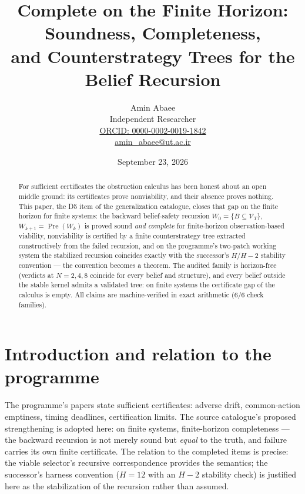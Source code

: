 \documentclass[10pt,twocolumn]{article}
\theoremstyle{definition}
\begin{document}
\title{Complete on the Finite Horizon: Soundness, Completeness,\\ and Counterstrategy Trees for the Belief Recursion}
\author{Amin Abaee\\[0.35em]
{\small Independent Researcher}\\[0.55em]
{\small\href{https://orcid.org/0000-0002-0019-1842}{ORCID: 0000-0002-0019-1842}}\\[0.3em]
{\small\href{mailto:amin\_abaee@ut.ac.ir}{amin\_abaee@ut.ac.ir}}}
\date{September 23, 2026}
\maketitle

\begin{abstract}
For sufficient certificates the obstruction calculus has been honest about
an open middle ground: its certificates prove nonviability, and their
absence proves nothing. This paper, the D5 item of the generalization
catalogue, closes that gap on the finite horizon for finite systems: the
backward belief-safety recursion $W_0=\{B\subseteq\mathcal V_T\}$,
$W_{k+1}=\operatorname{Pre}(W_k)$ is proved sound \emph{and complete} for
finite-horizon observation-based viability, nonviability is certified by a
finite counterstrategy tree extracted constructively from the failed
recursion, and on the programme's two-patch working system the stabilized
recursion coincides exactly with the successor's $H/H-2$ stability
convention --- the convention becomes a theorem. The audited family is
horizon-free (verdicts at $N=2,4,8$ coincide for every belief and
structure), and every belief outside the stable kernel admits a validated
tree: on finite systems the certificate gap of the calculus is empty. All
claims are machine-verified in exact arithmetic (6/6 check families).
\end{abstract}

\section{Introduction and relation to the programme}

The programme's papers state sufficient certificates: adverse drift,
common-action emptiness, timing deadlines, certification limits. The source
catalogue's proposed strengthening is adopted here: on finite systems,
finite-horizon completeness --- the backward recursion is not merely sound
but \emph{equal} to the truth, and failure carries its own finite
certificate. The relation to the completed items is precise: the viable
selector's recursive correspondence provides the semantics; the successor's
harness convention ($H=12$ with an $H-2$ stability check) is justified
here as the stabilization of the recursion rather than assumed.
\end{document}
